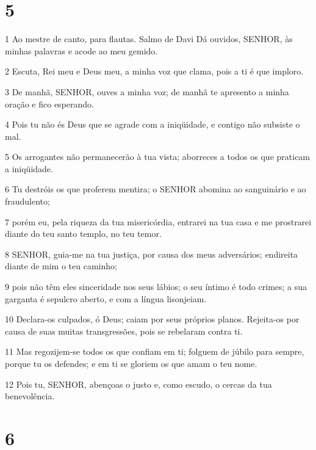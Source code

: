 \chapter{5}

\par 1 Ao mestre de canto, para flautas. Salmo de Davi Dá ouvidos, SENHOR, às minhas palavras e acode ao meu gemido.
\par 2 Escuta, Rei meu e Deus meu, a minha voz que clama, pois a ti é que imploro.
\par 3 De manhã, SENHOR, ouves a minha voz; de manhã te apresento a minha oração e fico esperando.
\par 4 Pois tu não és Deus que se agrade com a iniqüidade, e contigo não subsiste o mal.
\par 5 Os arrogantes não permanecerão à tua vista; aborreces a todos os que praticam a iniqüidade.
\par 6 Tu destróis os que proferem mentira; o SENHOR abomina ao sanguinário e ao fraudulento;
\par 7 porém eu, pela riqueza da tua misericórdia, entrarei na tua casa e me prostrarei diante do teu santo templo, no teu temor.
\par 8 SENHOR, guia-me na tua justiça, por causa dos meus adversários; endireita diante de mim o teu caminho;
\par 9 pois não têm eles sinceridade nos seus lábios; o seu íntimo é todo crimes; a sua garganta é sepulcro aberto, e com a língua lisonjeiam.
\par 10 Declara-os culpados, ó Deus; caiam por seus próprios planos. Rejeita-os por causa de suas muitas transgressões, pois se rebelaram contra ti.
\par 11 Mas regozijem-se todos os que confiam em ti; folguem de júbilo para sempre, porque tu os defendes; e em ti se gloriem os que amam o teu nome.
\par 12 Pois tu, SENHOR, abençoas o justo e, como escudo, o cercas da tua benevolência.

\chapter{6}

